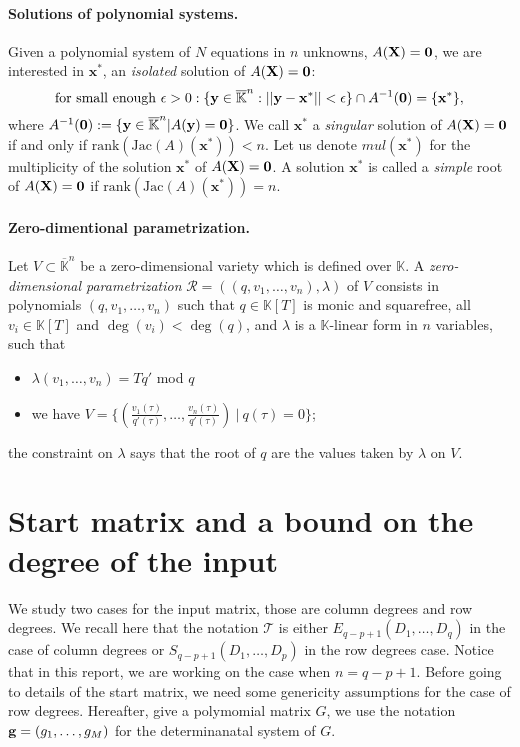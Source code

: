 \documentclass[11pt]{article}
\numberwithin{Property}{section}
\numberwithin{Theorem}{section}
\numberwithin{Proposition}{section}
\numberwithin{Lemma}{section}
\numberwithin{Corollary}{section}
\numberwithin{Definition}{section}
\numberwithin{Remark}{section}
\numberwithin{Conjecture}{section}
\numberwithin{Problem}{section}
\numberwithin{Claim}{section}
\theoremstyle{definition}
\numberwithin{Example}{section}
\def\bar{\overline}
\newcommand{\field}{\mathbb{K}} %
\newcommand{\mat}[1]{\mathbf{\MakeUppercase{#1}}} %
\begin{document}
\paragraph{Solutions of polynomial systems.} Given a polynomial system of $N$ equations in $n$ unknowns, $A(\mat{X}) = \mat{0}$, we are interested in $\mathbf{x}^*$, an \emph{isolated} solution of $A(\mat{X}) = \mat{0}$:
\[
\mathrm{for \ small \ enough} \ \epsilon > 0 : \{\mathbf{y} \in \bar{\field}^n : ||\mathbf{y} - \mathbf{x}^*|| < \epsilon\} \cap A^{-1}(\mat{0}) = \{\mathbf{x}^*\}, 
\] where $A^{-1}(\mat{0}) := \{\mathbf{y} \in \bar{\field}^n | A(\mathbf{y}) = \mat{0}\}$. We call $\mathbf{x}^*$ a \emph{singular} solution of $A(\mat{X}) = \mat{0}$ if and only if $\mathrm{rank}(\mathrm{Jac}(A)(\mathbf{x}^*)) < n$.  Let us denote $mul(\mathbf{x}^*)$ for the multiplicity of the solution $\mathbf{x}^*$ of $A(\mat{X}) = \mat{0}$.   A solution $\mathbf{x}^*$ is called a \emph{simple} root of $A(\mat{X}) = \mat{0}$ if  $\mathrm{rank}(\mathrm{Jac}(A)(\mathbf{x}^*)) = n$.
\paragraph{Zero-dimentional parametrization.} Let $V \subset \bar{\field}^n$ be a zero-dimensional variety which is defined over $\field$. A \emph{zero-dimensional parametrization} $\mathscr{R} = ((q,v_1, \ldots, v_n), \lambda)$ of $V$ consists in polynomials $(q,v_1, \ldots, v_n)$ such that $q \in \field[T]$ is monic and squarefree, all $v_i \in \field[T]$ and $\deg(v_i) < \deg(q)$, and $\lambda$ is a $\field$-linear form in $n$ variables, such that 
\begin{itemize}
\item $\lambda(v_1, \ldots, v_n) = Tq'$ mod $q$
\item we have $V = \{(\frac{v_1(\tau)}{q'(\tau)}, \ldots, \frac{v_n(\tau)}{q'(\tau)}) \ | \ q(\tau) = 0\}$;
\end{itemize}
the constraint on $\lambda$ says that the root of $q$ are the values taken by $\lambda$ on $V$. 

\section{Start matrix and a bound on the degree of the input}
\label{sec:startbound}
We study two cases for the input matrix, those are column degrees and row degrees. We recall here that the notation $\mathcal{T}$ is either $E_{q-p+1}(D_1, \ldots, D_q)$ in the case of column degrees or $S_{q-p+1}(D_1, \ldots, D_p)$ in the row degrees case. Notice that in this report, we are working on the case when $n = q-p+1$. Before going to details of the start matrix, we need some genericity assumptions for the case of row degrees. Hereafter, give a polymomial matrix $G$, we use the notation ${\bf g} = (g_1, \ldots, g_M)$ for the determinanatal system of $G$. 
\end{document}
